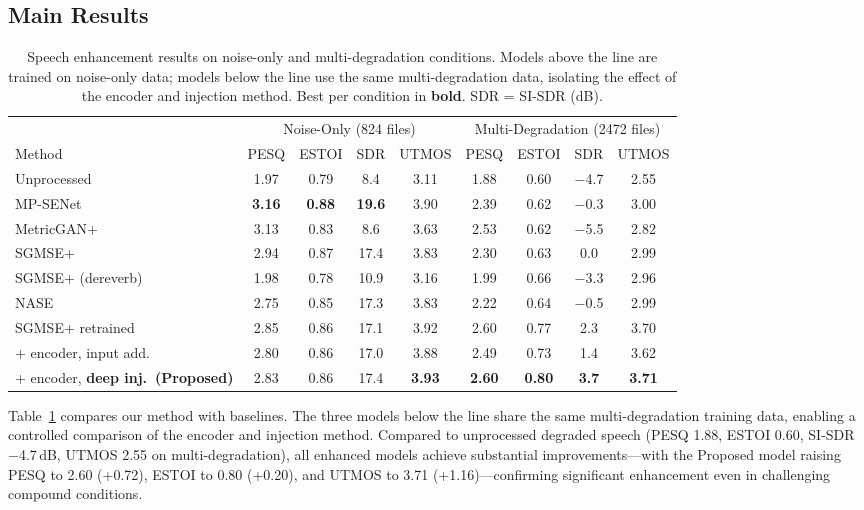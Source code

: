 \documentclass[cameraready]{Interspeech}
\begin{document}
\subsection{Main Results}

\begin{table}[!t]
\centering
\caption{Speech enhancement results on noise-only and multi-degradation conditions. Models above the line are trained on noise-only data; models below the line use the same multi-degradation data, isolating the effect of the encoder and injection method. Best per condition in \textbf{bold}. SDR = SI-SDR (dB).}
\label{tab:main_results}
\small
\setlength{\tabcolsep}{4pt}
\begin{tabular}{l|cccc|cccc}
\toprule
& \multicolumn{4}{c|}{Noise-Only (824 files)} & \multicolumn{4}{c}{Multi-Degradation (2472 files)} \\
Method & PESQ & ESTOI & SDR & UTMOS & PESQ & ESTOI & SDR & UTMOS \\
\midrule
Unprocessed & 1.97 & 0.79 & \phantom{0}8.4 & 3.11 & 1.88 & 0.60 & $-$4.7 & 2.55 \\
\midrule
MP-SENet~\cite{lu2023mpsenet} & \textbf{3.16} & \textbf{0.88} & \textbf{19.6} & 3.90 & 2.39 & 0.62 & $-$0.3 & 3.00 \\
MetricGAN+~\cite{fu2021metricgan} & 3.13 & 0.83 & \phantom{0}8.6 & 3.63 & 2.53 & 0.62 & $-$5.5 & 2.82 \\
SGMSE+~\cite{richter2023speech} & 2.94 & 0.87 & 17.4 & 3.83 & 2.30 & 0.63 & \phantom{$-$}0.0 & 2.99 \\
SGMSE+ (dereverb)~\cite{richter2023speech} & 1.98 & 0.78 & 10.9 & 3.16 & 1.99 & 0.66 & $-$3.3 & 2.96 \\
NASE~\cite{hu2023nase} & 2.75 & 0.85 & 17.3 & 3.83 & 2.22 & 0.64 & $-$0.5 & 2.99 \\
\midrule
SGMSE+ retrained & 2.85 & 0.86 & 17.1 & 3.92 & 2.60 & 0.77 & \phantom{$-$}2.3 & 3.70 \\
\quad + encoder, input add. & 2.80 & 0.86 & 17.0 & 3.88 & 2.49 & 0.73 & \phantom{$-$}1.4 & 3.62 \\
\quad + encoder, \textbf{deep inj.\ (Proposed)} & 2.83 & 0.86 & 17.4 & \textbf{3.93} & \textbf{2.60} & \textbf{0.80} & \textbf{\phantom{$-$}3.7} & \textbf{3.71} \\
\bottomrule
\end{tabular}
\end{table}

Table~\ref{tab:main_results} compares our method with baselines.
The three models below the line share the same multi-degradation training data, enabling a controlled comparison of the encoder and injection method.
Compared to unprocessed degraded speech (PESQ 1.88, ESTOI 0.60, SI-SDR $-$4.7\,dB, UTMOS 2.55 on multi-degradation), all enhanced models achieve substantial improvements---with the Proposed model raising PESQ to 2.60 (+0.72), ESTOI to 0.80 (+0.20), and UTMOS to 3.71 (+1.16)---confirming significant enhancement even in challenging compound conditions.
\end{document}
